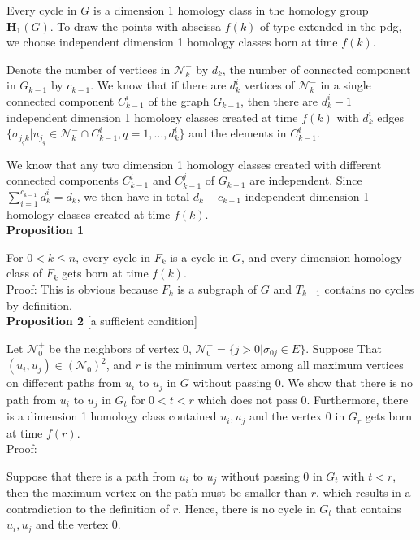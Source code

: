 \documentclass[a4paper,12pt]{article}
\numberwithin{equation}{section}
\begin{document}
	Every cycle in $G$ is a dimension 1 homology class in the homology group $\mathbf{H}_1(G)$. To draw the points with abscissa $f(k)$ of type extended in the pdg, we choose independent dimension 1 homology classes born at time $f(k)$.	
	
	Denote the number of vertices in $\mathcal{N}_k^-$ by $d_k$, the number of connected component in $G_{k-1}$ by $c_{k-1}$. 
	We know that if there are $d_k^i$ vertices of $\mathcal{N}_k^-$ in a single connected component $C^i_{k-1}$ of the graph $G_{k-1}$, then there are $d_k^i -1$ independent dimension 1 homology classes created at time $f(k)$ with $d_k^i$ edges $\{\sigma_{j_q k} \vert u_{j_q} \in \mathcal{N}_k^- \cap C^i_{k-1}, q = 1,\ldots, d_k^i \}$ and the elements in $C_{k-1}^i$. 
	
	We know that any two dimension 1 homology classes created with different connected components $C^i_{k-1}$ and $C^j_{k-1}$ of $G_{k-1}$ are independent.
	Since $\sum_{i=1}^{c_{k-1}} d_{k}^i = d_k$, we then have in total $d_k - c_{k-1}$ independent dimension 1 homology classes created at time $f(k)$.\\
	
	
	\noindent \textbf{Proposition 1} 
	
	For $0 < k \leq n$, every cycle in $F_k$ is a cycle in $G$, and every dimension homology class of $F_k$ gets born at time $f(k)$.\\
	
	\noindent Proof: This is obvious because $F_k$ is a subgraph of $G$ and $T_{k-1}$ contains no cycles by definition.\\
	
	
	\noindent \textbf{Proposition 2} [a sufficient condition]
	
	Let $\mathcal{N}^+_0$ be the neighbors of vertex $0$, $\mathcal{N}^+_0 = \{j >0 \vert \sigma_{0j} \in E\}$. Suppose That $(u_i, u_j) \in (\mathcal{N}_0)^2$, and $r$ is the minimum vertex among all maximum vertices on different paths from $u_i$ to $u_j$ in $G$ without passing $0$. We show that there is no path from $u_i$ to $u_j$ in $G_t$ for $0< t< r$ which does not pass $0$. Furthermore, there is a dimension 1 homology class contained $u_i, u_j$ and the vertex $0$ in $G_r$ gets born at time $f(r)$.\\
	
	\noindent Proof:
	
	Suppose that there is a path from $u_i$ to $u_j$ without passing $0$ in $G_t$ with $t<r$, then the maximum vertex on the path must be smaller than $r$, which results in a contradiction to the definition of $r$. Hence, there is no cycle in $G_t$ that contains $u_i, u_j$ and the vertex $0$. 
	
\end{document}

